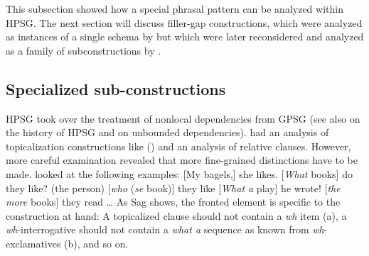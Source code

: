 \documentclass[output=paper
	        ,collection
	        ,collectionchapter
 	        ,biblatex
                ,babelshorthands
                ,newtxmath
                ,draftmode
                ,colorlinks, citecolor=brown
]{langscibook}
\begin{document}



This subsection showed how a special phrasal pattern can be analyzed within HPSG. The next section
will discuss filler-gap constructions, which were analyzed as instances of a single schema by
\citet{ps2} but which were later reconsidered and analyzed as a family of subconstructions by
.

\subsection{Specialized sub-constructions}

HPSG took over the treatment of nonlocal dependencies from GPSG \citep{Gazdar81a} (see also
 on the history of HPSG and  on
unbounded dependencies). \citet[Chapters~4 and~5]{ps2} had
an analysis of topicalization constructions like () and an analysis of relative
clauses. However, more careful examination revealed that more fine-grained distinctions have to be
made. \citet[]{Sag2010b} looked at the following examples:
\settowidth{}
\eal
\ex {}[My bagels,] she likes.                           
\ex {}[\emph{What} books] do they like?                  
\ex (the person) [\emph{who} (\emph{se} book)] they like  
\ex {}[\emph{What a} play] he wrote!                     
\ex {}[\emph{the more} books] they read \ldots          {}
\zl
As Sag shows, the fronted element is specific to the construction at hand:
\eal
{}
\zl
A topicalized clause should not contain a \emph{wh} item (a), a \emph{wh}-interrogative should not
contain a \emph{what a} sequence as known from \emph{wh}-exclamatives (b), and so on.
\end{document}
